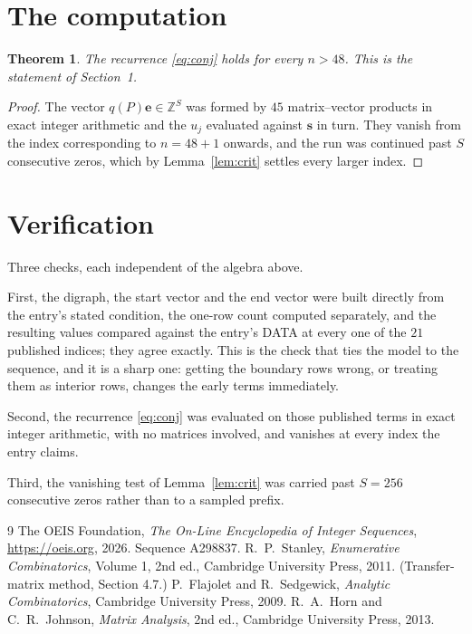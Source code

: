 \documentclass[11pt,a4paper]{article}
\theoremstyle{plain}
\newtheorem{theorem}{Theorem}
\theoremstyle{definition}
\begin{document}
\section{The computation}

\begin{theorem}
The recurrence \eqref{eq:conj} holds for every $n>48$. This is the statement of
Section~1.
\end{theorem}

\begin{proof}
The vector $q(P)\mathbf{e}\in\mathbb{Z}^{S}$ was formed by $45$ matrix--vector
products in exact integer arithmetic and the $u_j$ evaluated against $\mathbf{s}$ in turn.
They vanish from the index corresponding to $n=48+1$ onwards, and the run was continued
past $S$ consecutive zeros, which by Lemma~\ref{lem:crit} settles every larger index.
\end{proof}

\section{Verification}

Three checks, each independent of the algebra above.

First, the digraph, the start vector and the end vector were built directly from the
entry's stated condition, the one-row count computed separately, and the resulting values
compared against the entry's DATA at every one of the $21$ published indices; they
agree exactly. This is the check that ties the model to the sequence, and it is a sharp one:
getting the boundary rows wrong, or treating them as interior rows, changes the early terms
immediately.

Second, the recurrence \eqref{eq:conj} was evaluated on those published terms in exact
integer arithmetic, with no matrices involved, and vanishes at every index the entry claims.

Third, the vanishing test of Lemma~\ref{lem:crit} was carried past $S=256$ consecutive
zeros rather than to a sampled prefix.

\begin{thebibliography}{9}
 The OEIS Foundation, \emph{The On-Line Encyclopedia of Integer
Sequences}, \url{https://oeis.org}, 2026. Sequence A298837.
 R.~P.~Stanley, \emph{Enumerative Combinatorics}, Volume 1, 2nd ed.,
Cambridge University Press, 2011. (Transfer-matrix method, Section 4.7.)
 P.~Flajolet and R.~Sedgewick, \emph{Analytic Combinatorics}, Cambridge
University Press, 2009.
 R.~A.~Horn and C.~R.~Johnson, \emph{Matrix Analysis}, 2nd ed., Cambridge
University Press, 2013.
\end{thebibliography}
\end{document}
